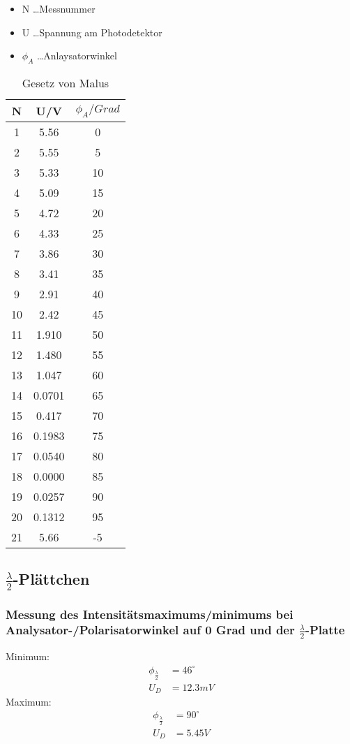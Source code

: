 \documentclass[a4paper]{article}
\begin{document}
  \begin{table}[ht]
    \centering
    \caption{Gesetz von Malus}
    \begin{itemize}
      \item N \dots Messnummer
      \item U \dots Spannung am Photodetektor
      \item $\phi_A$ \dots Anlaysatorwinkel
    \end{itemize}
    \begin{tabular}{|c|c|c|}
      \hline
      N&U/V&$\phi_A/Grad$\\
      \hline
      1&5.56&0\\
      \hline
      2&5.55&5\\
      \hline
      3&5.33&10\\
      \hline
      4&5.09&15\\
      \hline
      5&4.72&20\\
      \hline
      6&4.33&25\\
      \hline
      7&3.86&30\\
      \hline
      8&3.41&35\\
      \hline
      9&2.91&40\\
      \hline
      10&2.42&45\\
      \hline
      11&1.910&50\\
      \hline
      12&1.480&55\\
      \hline
      13&1.047&60\\
      \hline
      14&0.0701&65\\
      \hline
      15&0.417&70\\
      \hline
      16&0.1983&75\\
      \hline
      17&0.0540&80\\
      \hline
      18&0.0000&85\\
      \hline
      19&0.0257&90\\
      \hline
      20&0.1312&95\\
      \hline
      21&5.66&-5\\
      \hline
    \end{tabular}
    \label{tab:1}
  \end{table}

  \newpage
  \subsection{$\frac{\lambda}{2}$-Plättchen}
  \subsubsection{Messung des Intensitätsmaximums/minimums bei Analysator-/Polarisatorwinkel auf 0 Grad und der $\frac{\lambda}{2}$-Platte}
Minimum:
\begin{align}
  \phi_{\frac{\lambda}{2}}&=46^\circ\\
  U_D &= 12.3mV
\end{align}
Maximum:
\begin{align}
  \phi_{\frac{\lambda}{2}}&=90^\circ\\
  U_D &= 5.45V
\end{align}
\end{document}
